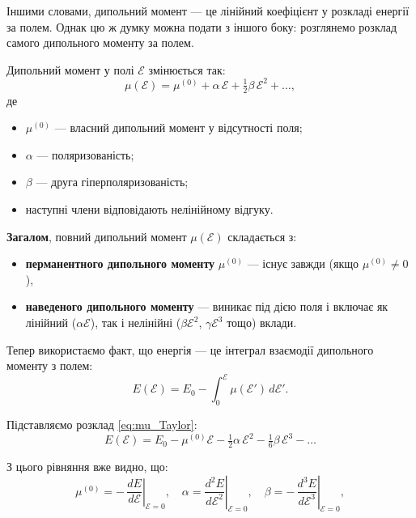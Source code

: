 \documentclass{PySCFBook}
\begin{document}
Іншими словами, дипольний момент — це лінійний коефіцієнт у розкладі
енергії за полем. Однак цю ж думку можна подати з іншого боку:
розглянемо розклад самого дипольного моменту за полем.

Дипольний момент у полі $\mathcal{E}$ змінюється так:
\begin{equation}
	\mu(\mathcal{E})
	=
	\mu^{(0)}
	+
	\alpha\,\mathcal{E}
	+
	\tfrac12 \beta\,\mathcal{E}^2
	+\dots ,
	\label{eq:mu_Taylor}
\end{equation}
де
\begin{itemize}
	\item $\mu^{(0)}$ --- власний дипольний момент у відсутності поля;
	\item $\alpha$ --- поляризованість;
	\item $\beta$ --- друга гіперполяризованість;
	\item наступні члени відповідають нелінійному відгуку.
\end{itemize}

\textbf{Загалом}, повний дипольний момент \(\mu(\mathcal{E})\) складається з:
\begin{itemize}
\item \textbf{перманентного дипольного моменту} \(\mu^{(0)}\) — існує завжди (якщо \(\mu^{(0)} \neq 0\)),
\item \textbf{наведеного дипольного моменту} — виникає під дією поля і включає як лінійний (\(\alpha \mathcal{E}\)), так і нелінійні (\(\beta \mathcal{E}^2\), \(\gamma \mathcal{E}^3\) тощо) вклади.
\end{itemize}

Тепер використаємо факт, що енергія --- це інтеграл взаємодії дипольного моменту з полем:
\begin{equation}
	E(\mathcal{E})
	=
	E_0 - \int_0^{\mathcal{E}} \mu(\mathcal{E}')\, d\mathcal{E}'.
	\label{eq:E_as_integral_of_mu}
\end{equation}

Підставляємо розклад \eqref{eq:mu_Taylor}:
\begin{equation}
	E(\mathcal{E}) =
	E_0
	- \mu^{(0)}\mathcal{E}
	- \tfrac12 \alpha\,\mathcal{E}^2
	- \tfrac16 \beta\,\mathcal{E}^3
	- \dots
	\label{eq:E_expanded_correct}
\end{equation}

З цього рівняння вже видно, що:
\begin{equation}
	\mu^{(0)}  = -\,\left.\frac{dE}{d\mathcal{E}}\right|_{\mathcal{E}=0}, \quad
	\alpha     = \left.\frac{d^2E}{d\mathcal{E}^2}\right|_{\mathcal{E}=0}, \quad
	\beta      = -\,\left.\frac{d^3E}{d\mathcal{E}^3}\right|_{\mathcal{E}=0},
\end{equation}
\end{document}
